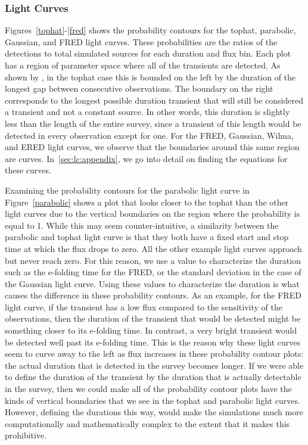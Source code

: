 \documentclass[12pt]{article}
\begin{document}
\subsubsection{Light Curves}\label{lcdiscussion}
Figures~\ref{tophat}-\ref{fred} shows the probability contours for the tophat, parabolic, Gaussian, and FRED light curves. These probabilities are the ratios of the detections to total simulated sources for each duration and flux bin. Each plot has a region of parameter space where all of the transients are detected. As shown by \citet{2017MNRAS.465.4106C}, in the tophat case this is bounded on the left by the duration of the longest gap between consecutive observations. The boundary on the right corresponds to the longest possible duration transient that will still be considered a transient and not a constant source. In other words, this duration is slightly less than the length of the entire survey, since a transient of this length would be detected in every observation except for one.  For the FRED, Gaussian, Wilma, and ERED light curves, we observe that the boundaries around this same region are curves. In~\ref{sec:lc:appendix}, we go into detail on finding the equations for these curves. 

Examining the probability contours for the parabolic light curve in Figure~\ref{parabolic} shows a plot that looks closer to the tophat than the other light curves due to the vertical boundaries on the region where the probability is equal to 1. While this may seem counter-intuitive, a similarity between the parabolic and tophat light curve is that they both have a fixed start and stop time at which the flux drops to zero. All the other example light curves approach but never reach zero. For this reason, we use a value to characterize the duration such as the e-folding time for the FRED, or the standard deviation in the case of the Gaussian light curve. Using these values to characterize the duration is what causes the difference in these probability contours. As an example, for the FRED light curve, if the transient has a low flux compared to the sensitivity of the observations, then the duration of the transient that would be detected might be something closer to its e-folding time. In contrast, a very bright transient would be detected well past its e-folding time. This is the reason why these light curves seem to curve away to the left as flux increases in these probability contour plots: the actual duration that is detected in the survey becomes longer. If we were able to define the duration of the transient by the duration that is actually detectable in the survey, then we could make all of the probability contour plots have the kinds of vertical boundaries that we see in the tophat and parabolic light curves. However, defining the durations this way, would make the simulations much more computationally and mathematically complex to the extent that it makes this prohibitive. 
\end{document}
